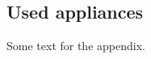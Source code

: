 \pagestyle{appendix}
\renewcommand*{\thepage}{A\arabic{page}}
\begin{appendices}
\chapter{Used appliances}\thispagestyle{appendix}
Some text for the appendix.

\end{appendices}
\label{AlmostVeryLastPage}
\clearpage
{}
\pagestyle{references}
\renewcommand*{\thepage}{B\arabic{page}}

\nocite{*}


